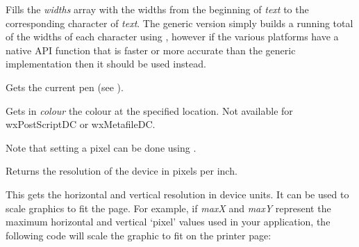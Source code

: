 
Fills the {\it widths} array with the widths from the beginning of 
{\it text} to the corresponding character of {\it text}.  The generic
version simply builds a running total of the widths of each character
using , however if the
various platforms have a native API function that is faster or more
accurate than the generic implementation then it should be used
instead. 



\label{wxdcgetpen}


Gets the current pen (see ).


\label{wxdcgetpixel}


Gets in {\it colour} the colour at the specified location.
Not available for wxPostScriptDC or wxMetafileDC.

Note that setting a pixel can be done using .



\label{wxdcgetppi}


Returns the resolution of the device in pixels per inch.

\label{wxdcgetsize}



This gets the horizontal and vertical resolution in device units. It can be used to scale graphics to fit the page.
For example, if {\it maxX} and {\it maxY}\rtfsp
represent the maximum horizontal and vertical `pixel' values used in your
application, the following code will scale the graphic to fit on the
printer page:

